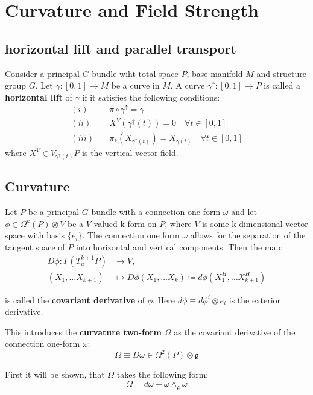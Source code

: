 
\chapter{Curvature and Field Strength}

\section{horizontal lift and parallel transport}

Consider a principal $G$ bundle wiht total space $P$, base manifold $M$ and structure group $G$. Let $\gamma: [0,1] \to M$ be a curve in $M$. A curve $\gamma^\uparrow : [0,1] \to P$ is called a \textbf{horizontal lift} of $\gamma$ if it satisfies the following conditions:
\begin{align*}
  (i) \quad & \pi \circ \gamma^\uparrow = \gamma \\
  (ii) \quad & X^V(\gamma^\uparrow(t)) = 0 \quad \forall t \in [0,1] \\
  (iii) \quad & \pi_*(X_{\gamma^\uparrow(t)}) = X_{\gamma(t)} \quad \forall t \in [0,1]
\end{align*}
where $X^V \in V_{\gamma^\uparrow(t)}P$ is the vertical vector field.


\section{Curvature}

Let $P$ be a principal $G$-bundle with a connection one form $\omega$ and let $\phi \in \Omega^k(P) \otimes V$ be a $V$ valued k-form on $P$, where $V$ is some k-dimensional vector space with basis $\{e_i\}$. The connection one form $\omega$ allows for the separation of the tangent space of $P$ into horizontal and vertical components. Then the map:
\begin{align*}
  D\phi : \Gamma(T^{k+1}_uP) & \to V , \\
  (X_1,\dots X_{k+1})& \mapsto D\phi(X_1, \dots X_k) \coloneq d\phi(X^H_1,\dots X^H_{k+1})
\end{align*}

is called the \textbf{covariant derivative} of $\phi$. Here $d\phi \equiv d \phi^i \otimes e_i$ is the exterior derivative.

This introduces the \textbf{curvature two-form} $\Omega$ as the covariant derivative of the connection one-form $\omega$:
\[ \Omega \equiv D\omega \in \Omega^2(P) \otimes \mathfrak{g} \]

First it will be shown, that $\Omega$ takes the following form:
\[ \Omega = d\omega + \omega \wedge_{\mathfrak{g}} \omega \]


